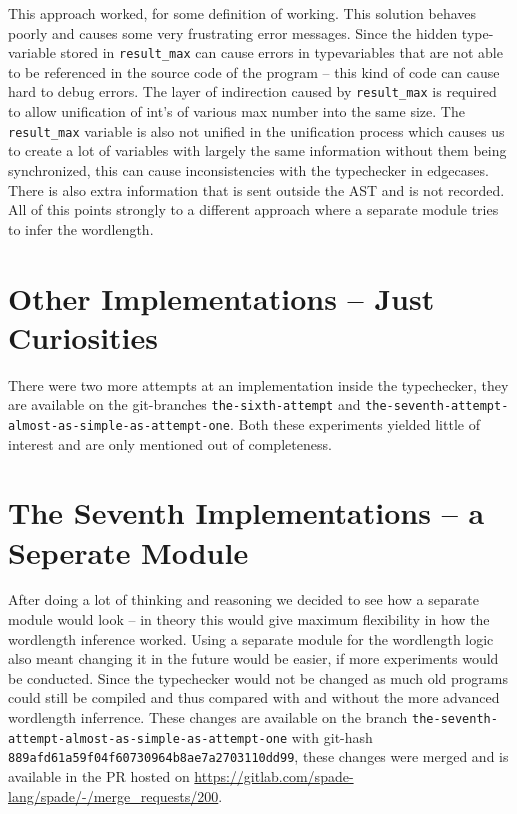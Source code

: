 \documentclass[msc,lith,english]{liuthesis}
\begin{document}
This approach worked, for some definition of working. This solution behaves poorly and causes some very frustrating error messages. Since the hidden type-variable stored in \verb+result_max+ can cause errors in typevariables that are not able to be referenced in the source code of the program -- this kind of code can cause hard to debug errors. The layer of indirection caused by \verb+result_max+ is required to allow unification of int's of various max number into the same size. The \verb+result_max+ variable is also not unified in the unification process which causes us to create a lot of variables with largely the same information without them being synchronized, this can cause inconsistencies with the typechecker in edgecases. There is also extra information that is sent outside the AST and is not recorded. All of this points strongly to a different approach where a separate module tries to infer the wordlength.

\section{Other Implementations -- Just Curiosities}
\label{sec:Other}
There were two more attempts at an implementation inside the typechecker, they are available on the git-branches \verb+the-sixth-attempt+ and \verb+the-seventh-attempt-almost-as-simple-as-attempt-one+. Both these experiments yielded little of interest and are only mentioned out of completeness.


\section{The Seventh Implementations -- a Seperate Module}
\label{sec:Seven}
After doing a lot of thinking and reasoning we decided to see how a separate module would look -- in theory this would give maximum flexibility in how the wordlength inference worked. Using a separate module for the wordlength logic also meant changing it in the future would be easier, if more experiments would be conducted. Since the typechecker would not be changed as much old programs could still be compiled and thus compared with and without the more advanced wordlength inferrence. These changes are available on the branch \verb+the-seventh-attempt-almost-as-simple-as-attempt-one+ with git-hash \verb+889afd61a59f04f60730964b8ae7a2703110dd99+, these changes were merged and is available in the PR hosted on \url{https://gitlab.com/spade-lang/spade/-/merge_requests/200}.
\end{document}
